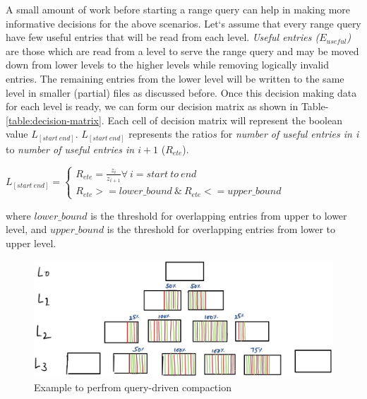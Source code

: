 A small amount of work before starting a range query can help in making more informative decisions for the above 
scenarios. Let`s assume that every range query have few useful entries that will be read from each level. 
\textit{Useful entries ($E_{useful}$)} are those which are read from a level to serve the range query and may be moved 
down from lower levels to the higher levels while removing logically invalid entries. The remaining entries
from the lower level will be written to the same level in smaller (partial) files as discussed before. 
Once this decision making data for each level is ready, we can form our decision matrix as shown in Table-\ref{table:decision-matrix}. 
Each cell of decision matrix will represent the boolean value $L_{[start\ end]}$. $L_{[start\ end]}$ represents the ratio\(s\) for \textit{number of useful entries 
in i} to \textit{number of useful entries in $i+1$} ($R_{ete}$).
\hfill
\begin{center}
\begin{math}
    L_{[start\ end]}=\left\{
      \begin{array}{ll}
        R_{ete} = \frac{z_{i}}{z_{i+1}} \forall\ i=start\ to\ end\\
        R_{ete} >= lower\_bound\ \&\ R_{ete} <= upper\_bound
      \end{array}
    \right.
  \end{math}
\end{center}
\hfill \break
where \textit{$lower\_bound$} is the threshold for overlapping entries from upper to lower level, and \textit{$upper\_bound$} 
is the threshold for overlapping entries from lower to upper level.

\begin{figure}
    \includegraphics[scale=0.2]{Figures/first-state-lsm.jpg}
    \caption{Example to perfrom query-driven compaction}\label{fig:first-state-lsm}
\end{figure}


